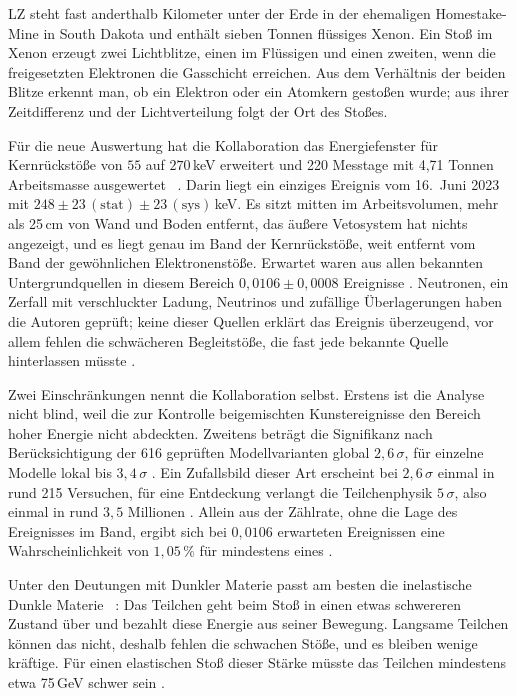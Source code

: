 LZ steht fast anderthalb Kilometer unter der Erde in der ehemaligen Homestake-Mine in South Dakota
und enthält sieben Tonnen flüssiges Xenon. Ein Stoß im Xenon erzeugt zwei Lichtblitze, einen im
Flüssigen und einen zweiten, wenn die freigesetzten Elektronen die Gasschicht erreichen. Aus dem
Verhältnis der beiden Blitze erkennt man, ob ein Elektron oder ein Atomkern gestoßen wurde; aus ihrer
Zeitdifferenz und der Lichtverteilung folgt der Ort des Stoßes.

Für die neue Auswertung hat die Kollaboration das Energiefenster für Kernrückstöße von $55$ auf
$270$\,keV erweitert und 220 Messtage mit 4{,}71 Tonnen Arbeitsmasse ausgewertet \QM~\cite{LZ2026}.
Darin liegt ein einziges Ereignis vom 16.~Juni 2023 mit $248\pm23\,(\text{stat})\pm23\,(\text{sys})$\,keV.
Es sitzt mitten im Arbeitsvolumen, mehr als 25\,cm von Wand und Boden entfernt, das äußere
Vetosystem hat nichts angezeigt, und es liegt genau im Band der Kernrückstöße, weit entfernt vom Band
der gewöhnlichen Elektronenstöße. Erwartet waren aus allen bekannten Untergrundquellen in diesem
Bereich $0{,}0106\pm0{,}0008$ Ereignisse \QM. Neutronen, ein Zerfall mit verschluckter Ladung,
Neutrinos und zufällige Überlagerungen haben die Autoren geprüft; keine dieser Quellen erklärt das
Ereignis überzeugend, vor allem fehlen die schwächeren Begleitstöße, die fast jede bekannte Quelle
hinterlassen müsste \QM.

Zwei Einschränkungen nennt die Kollaboration selbst. Erstens ist die Analyse nicht blind, weil die
zur Kontrolle beigemischten Kunstereignisse den Bereich hoher Energie nicht abdeckten. Zweitens
beträgt die Signifikanz nach Berücksichtigung der 616 geprüften Modellvarianten global
$2{,}6\,\sigma$, für einzelne Modelle lokal bis $3{,}4\,\sigma$ \QM. Ein Zufallsbild dieser Art
erscheint bei $2{,}6\,\sigma$ einmal in rund 215 Versuchen, für eine Entdeckung verlangt die
Teilchenphysik $5\,\sigma$, also einmal in rund $3{,}5$ Millionen \KM. Allein aus der Zählrate,
ohne die Lage des Ereignisses im Band, ergibt sich bei $0{,}0106$ erwarteten Ereignissen eine
Wahrscheinlichkeit von $1{,}05\,\%$ für mindestens eines \KM.

Unter den Deutungen mit Dunkler Materie passt am besten die inelastische Dunkle Materie
\QM~\cite{TuckerSmithWeiner2001}: Das Teilchen geht beim Stoß in einen etwas schwereren Zustand
über und bezahlt diese Energie aus seiner Bewegung. Langsame Teilchen können das nicht, deshalb
fehlen die schwachen Stöße, und es bleiben wenige kräftige. Für einen elastischen Stoß dieser Stärke
müsste das Teilchen mindestens etwa 75\,GeV schwer sein \KM.

